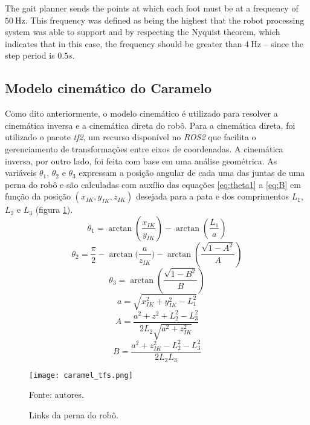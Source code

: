 \documentclass[conference]{IEEEtran}
\begin{document}
The gait planner sends the points at which each foot must be at a frequency of $\SI{50}{\hertz}$. This frequency was defined as being the highest that the robot processing system was able to support and by respecting the Nyquist theorem, which indicates that in this case, the frequency should be greater than $\SI{4}{\hertz}$ -- since the step period is $0.5 s$.

\subsection{Modelo cinemático do Caramelo}
\label{sec:detail_inv_kinematics}

Como dito anteriormente, o modelo cinemático é utilizado para resolver a cinemática inversa e a cinemática direta do robô. Para a cinemática direta, foi utilizado o pacote \textit{tf2}, um recurso disponível no \textit{ROS2} que facilita o gerenciamento de transformações entre eixos de coordenadas. A cinemática inversa, por outro lado, foi feita com base em uma análise geométrica. As variáveis $\theta_1$, $\theta_2$ e $\theta_3$ expressam a posição angular de cada uma das juntas de uma perna do robô e são calculadas com auxílio das equações \ref{eq:theta1} a \ref{eq:B} em função da posição $(x_{IK}, y_{IK}, z_{IK})$ desejada para a pata e dos comprimentos $L_1$, $L_2$ e $L_3$ (figura \ref{fig:caramel_tfs}).
\begin{equation}
  \label{eq:theta1}
  \theta_1 = \arctan{(\frac{x_{IK}}{y_{IK}})} - \arctan{(\frac{L_1}{a})}
\end{equation}
\begin{equation}
  \label{eq:theta2}
  \theta_2 = \frac{\pi}{2} - \arctan{(\frac{a}{z_{IK}}}) - \arctan{(\frac{\sqrt{1-A^2}}{A})}
\end{equation}
\begin{equation}
  \label{eq:theta3}
  \theta_3 = \arctan(\frac{\sqrt{1-B^2}}{B})
\end{equation}
\begin{equation}
  \label{eq:a}
  a = \sqrt{x_{IK}^2+y_{IK}^2-L_1^2}
\end{equation}
\begin{equation}
  \label{eq:A}
  A =\frac{a^2+z^2+L_2^2-L_3^2}{2L_2\sqrt{a^2+z_{IK}^2}}
\end{equation}
\begin{equation}
  \label{eq:B}
  B = \frac{a^2+z_{IK}^2-L_2^2-L_3^2}{2L_2L_3}
\end{equation}

\begin{figure}[htbp]
  \centering
  \texttt{[image: caramel\_tfs.png]}

  \caption{Links da perna do robô.}
  Fonte: autores.
  \label{fig:caramel_tfs}
\end{figure}
\end{document}
